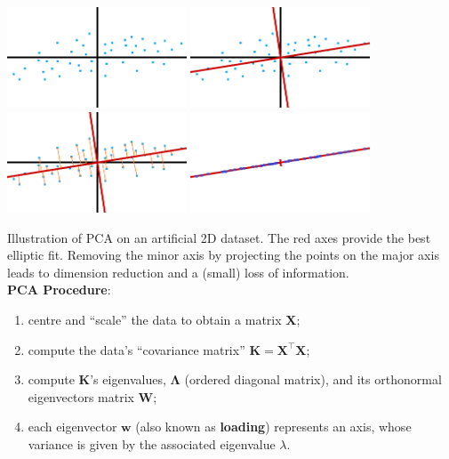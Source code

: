 \documentclass[20pt,landscape,footrule,headrule]{foils}
\begin{document}
{{\newpage
\begin{center}
\includegraphics[width=0.4\textwidth]{Images/PC1.png}\quad
\includegraphics[width=0.4\textwidth]{Images/PC2.png}\\
\includegraphics[width=0.4\textwidth]{Images/PC3.png}\quad
\includegraphics[width=0.4\textwidth]{Images/PC4.png}
\end{center} Illustration of PCA on an artificial 2D dataset. The red axes  provide the best elliptic fit. Removing the minor axis by projecting the points on the major axis leads to dimension reduction and a (small) loss of information. \newpage\ \\ 
\noindent \textbf{PCA Procedure}: 
\begin{enumerate} 
\item centre and ``scale'' the data to obtain a matrix $\mathbf{X}$;
\item compute the data's ``covariance matrix'' $\mathbf{K}=\mathbf{X}^{\!\top}\mathbf{X}$;
\item compute $\mathbf{K}$'s eigenvalues, $\mathbf{\Lambda}$ (ordered diagonal matrix), and its orthonormal eigenvectors matrix $\mathbf{W}$;
\item each eigenvector $\mathbf{w}$ (also known as \textbf{loading}) represents an axis, whose variance is given by the associated eigenvalue $\lambda$. \end{enumerate}
}}
\end{document}
